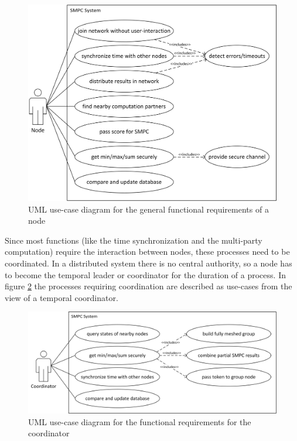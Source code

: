 \begin{figure}[!htb] %
	\caption[General functional requirements of a node]{\gls{UML} use-case diagram for the general functional requirements of a node} \label{figure:requirements use-case node}
	\includegraphics[scale=0.85]{figures/use-case-node.png}
\end{figure}

Since most functions (like the time synchronization and the multi-party computation) require the interaction between nodes, these processes need to be coordinated. In a distributed system there is no central authority, so a node has to become the temporal leader or coordinator for the duration of a process. In figure \ref{figure:requirements use-case coordinator} the processes requiring coordination are described as use-cases from the view of a temporal coordinator.

\begin{figure}[!htb] %
	\caption[Use-case diagram for coordinator requirements]{\gls{UML} use-case diagram for the functional requirements for the coordinator} \label{figure:requirements use-case coordinator}
	\includegraphics[scale=0.75]{figures/use-case-coordinator.png}
\end{figure}

